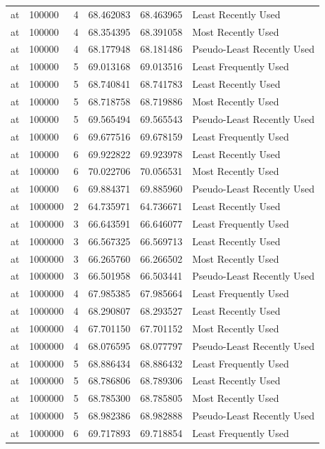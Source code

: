 \begin{tabular}{llrrrl}
at & 100000 & 4 & 68.462083 & 68.463965 & Least Recently Used \\
at & 100000 & 4 & 68.354395 & 68.391058 & Most Recently Used \\
at & 100000 & 4 & 68.177948 & 68.181486 & Pseudo-Least Recently Used \\
at & 100000 & 5 & 69.013168 & 69.013516 & Least Frequently Used \\
at & 100000 & 5 & 68.740841 & 68.741783 & Least Recently Used \\
at & 100000 & 5 & 68.718758 & 68.719886 & Most Recently Used \\
at & 100000 & 5 & 69.565494 & 69.565543 & Pseudo-Least Recently Used \\
at & 100000 & 6 & 69.677516 & 69.678159 & Least Frequently Used \\
at & 100000 & 6 & 69.922822 & 69.923978 & Least Recently Used \\
at & 100000 & 6 & 70.022706 & 70.056531 & Most Recently Used \\
at & 100000 & 6 & 69.884371 & 69.885960 & Pseudo-Least Recently Used \\
at & 1000000 & 2 & 64.735971 & 64.736671 & Least Recently Used \\
at & 1000000 & 3 & 66.643591 & 66.646077 & Least Frequently Used \\
at & 1000000 & 3 & 66.567325 & 66.569713 & Least Recently Used \\
at & 1000000 & 3 & 66.265760 & 66.266502 & Most Recently Used \\
at & 1000000 & 3 & 66.501958 & 66.503441 & Pseudo-Least Recently Used \\
at & 1000000 & 4 & 67.985385 & 67.985664 & Least Frequently Used \\
at & 1000000 & 4 & 68.290807 & 68.293527 & Least Recently Used \\
at & 1000000 & 4 & 67.701150 & 67.701152 & Most Recently Used \\
at & 1000000 & 4 & 68.076595 & 68.077797 & Pseudo-Least Recently Used \\
at & 1000000 & 5 & 68.886434 & 68.886432 & Least Frequently Used \\
at & 1000000 & 5 & 68.786806 & 68.789306 & Least Recently Used \\
at & 1000000 & 5 & 68.785300 & 68.785805 & Most Recently Used \\
at & 1000000 & 5 & 68.982386 & 68.982888 & Pseudo-Least Recently Used \\
at & 1000000 & 6 & 69.717893 & 69.718854 & Least Frequently Used \\

\end{tabular}
